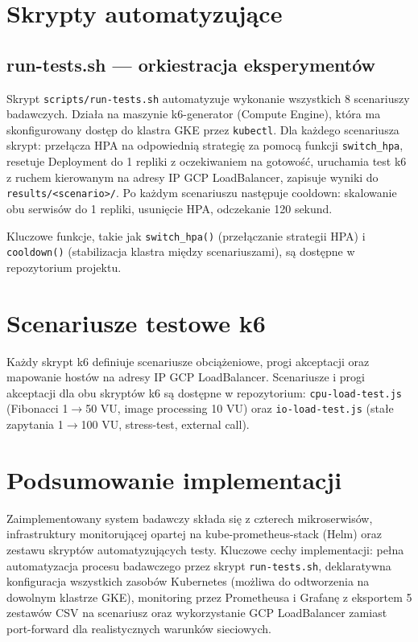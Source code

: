 \section{Skrypty automatyzujące}

\subsection{run-tests.sh — orkiestracja eksperymentów}

Skrypt \texttt{scripts/run-tests.sh} automatyzuje wykonanie wszystkich 8 scenariuszy badawczych. Działa na maszynie k6-generator (Compute Engine), która ma skonfigurowany dostęp do klastra GKE przez \texttt{kubectl}. Dla każdego scenariusza skrypt: przełącza HPA na odpowiednią strategię za pomocą funkcji \texttt{switch\_hpa}, resetuje Deployment do 1 repliki z oczekiwaniem na gotowość, uruchamia test k6 z ruchem kierowanym na adresy IP GCP LoadBalancer, zapisuje wyniki do \texttt{results/<scenario>/}. Po każdym scenariuszu następuje cooldown: skalowanie obu serwisów do 1 repliki, usunięcie HPA, odczekanie 120 sekund.

Kluczowe funkcje, takie jak \texttt{switch\_hpa()} (przełączanie strategii HPA) i \texttt{cooldown()} (stabilizacja klastra między scenariuszami), są dostępne w repozytorium projektu.

\section{Scenariusze testowe k6}

Każdy skrypt k6 definiuje scenariusze obciążeniowe, progi akceptacji oraz mapowanie hostów na adresy IP GCP LoadBalancer. Scenariusze i progi akceptacji dla obu skryptów k6 są dostępne w repozytorium: \texttt{cpu-load-test.js} (Fibonacci 1$\rightarrow$50 VU, image processing 10 VU) oraz \texttt{io-load-test.js} (stałe zapytania 1$\rightarrow$100 VU, stress-test, external call).

\section{Podsumowanie implementacji}

Zaimplementowany system badawczy składa się z czterech mikroserwisów, infrastruktury monitorującej opartej na kube-prometheus-stack (Helm) oraz zestawu skryptów automatyzujących testy. Kluczowe cechy implementacji: pełna automatyzacja procesu badawczego przez skrypt \texttt{run-tests.sh}, deklaratywna konfiguracja wszystkich zasobów Kubernetes (możliwa do odtworzenia na dowolnym klastrze GKE), monitoring przez Prometheusa i Grafanę z eksportem 5 zestawów CSV na scenariusz oraz wykorzystanie GCP LoadBalancer zamiast port-forward dla realistycznych warunków sieciowych.

